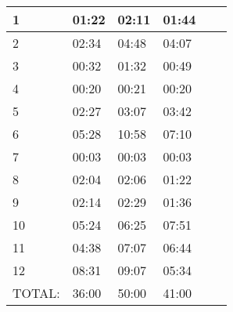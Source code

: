 \documentclass{l4proj}
\begin{document}
\begin{appendices}
\begin{tabular}{  | l | l | l | l | l | l | }
\hline
  1 & 01:22 & 02:11 & 01:44 \\
\hline
  2 & 02:34 & 04:48 & 04:07 \\
\hline  
  3 & 00:32 & 01:32 & 00:49 \\
\hline  
  4 & 00:20 & 00:21 & 00:20 \\
\hline  
  5 & 02:27 & 03:07 & 03:42 \\
\hline  
  6 & 05:28 & 10:58 & 07:10 \\
\hline
  7 & 00:03 & 00:03 & 00:03 \\
\hline
  8 & 02:04 & 02:06 & 01:22 \\
\hline
  9 & 02:14 & 02:29 & 01:36 \\
\hline
  10 & 05:24 & 06:25 & 07:51 \\
\hline
  11 & 04:38 & 07:07 & 06:44 \\
\hline
  12 & 08:31 & 09:07 & 05:34 \\
\hline
  TOTAL: & 36:00 & 50:00 & 41:00\\
\hline
\end{tabular}


\end{appendices}
\end{document}
